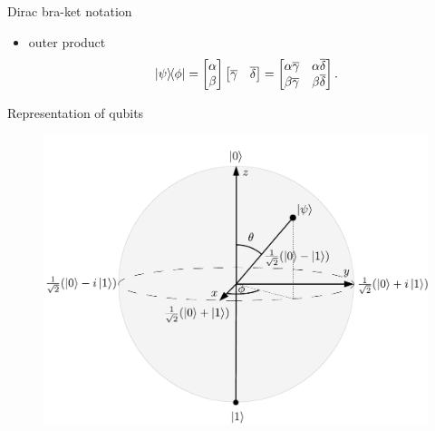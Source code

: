 \begin{frame}{Dirac bra-ket notation}
\begin{itemize}
                \item outer product
                \begin{equation*}
                    \ketbra{\psi}{\phi} = 
                    \begin{bmatrix}
                        \alpha \\
                        \beta
                    \end{bmatrix}
                    \begin{bmatrix}
                        \overline{\gamma} & \overline{\delta}
                    \end{bmatrix}
                    =
                    \begin{bmatrix}
                        \alpha \overline{\gamma} &  \alpha \overline{\delta}\\
                        \beta \overline{\gamma} &   \beta \overline{\delta}
                    \end{bmatrix}.
                \end{equation*}
            \end{itemize}
        \end{frame}
        \begin{frame}{Representation of qubits}
            \begin{figure}
                \includegraphics[scale=0.5]{pics/bloch}
            \end{figure}
        \end{frame}
